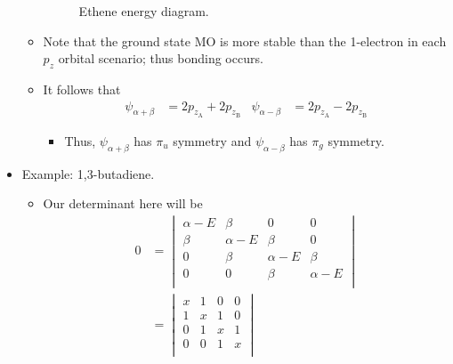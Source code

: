 \documentclass[../notes.tex]{subfiles}
\begin{document}
\begin{itemize}
\begin{itemize}
\begin{figure}[h!]
            \caption{Ethene energy diagram.}
            \label{fig:etheneEN}
        \end{figure}
        \item Note that the ground state MO is more stable than the 1-electron in each $p_z$ orbital scenario; thus bonding occurs.
        \item It follows that
        \begin{align*}
            \psi_{\alpha+\beta} &= 2p_{z_\text{A}}+2p_{z_\text{B}}&
            \psi_{\alpha-\beta} &= 2p_{z_\text{A}}-2p_{z_\text{B}}
        \end{align*}
        \begin{itemize}
            \item Thus, $\psi_{\alpha+\beta}$ has $\pi_u$ symmetry and $\psi_{\alpha-\beta}$ has $\pi_g$ symmetry.
        \end{itemize}
    \end{itemize}
    \item Example: 1,3-butadiene.
    \begin{itemize}
        \item Our determinant here will be
        \begin{align*}
            0 &=
            \begin{vmatrix}
                \alpha-E & \beta & 0 & 0\\
                \beta & \alpha-E & \beta & 0\\
                0 & \beta & \alpha-E & \beta\\
                0 & 0 & \beta & \alpha-E\\
            \end{vmatrix}\\
            &=
            \begin{vmatrix}
                x & 1 & 0 & 0\\
                1 & x & 1 & 0\\
                0 & 1 & x & 1\\
                0 & 0 & 1 & x\\

\end{vmatrix}
\end{align*}
\end{itemize}
\end{itemize}
\end{document}
